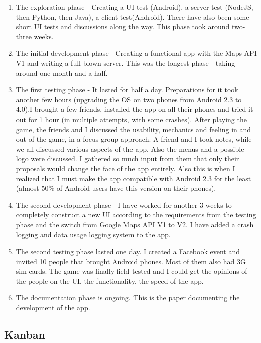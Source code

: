 \documentclass{article}
\begin{document}
\begin{enumerate}
  \item The exploration phase - Creating a UI test (Android), a server test
  (NodeJS, then Python, then Java), a client test(Android). There have also
  been some short UI tests and discussions along the way. This phase took around
  two-three weeks.
  \item The initial development phase - Creating a functional app with the Maps
  API V1 and writing a full-blown server. This was the longest phase - taking
  around one month and a half.
  \item The first testing phase - It lasted for half a day. Preparations for it
  took another few hours (upgrading the OS on two phones from Android 2.3 to
  4.0).I brought a few friends, installed the app on all their phones and tried
  it out for 1 hour (in multiple attempts, with some crashes). After playing
  the game, the friends and I discussed the usability, mechanics and feeling in
  and out of the game, in a focus group approach. A friend and I took notes,
  while we all discussed various aspects of the app. Also the menus and a
  possible logo were discussed. I gathered so much input from them that only
  their proposals would change the face of the app entirely. Also this is when I
  realized that I must make the app compatible with Android 2.3 for the least
  (almost 50\% of Android users have this version on their phones).
  \item The second development phase - I have worked for another 3 weeks to
  completely construct a new UI according to the requirements from the testing
  phase and the switch from Google Maps API V1 to V2. I have added a crash
  logging and data usage logging system to the app.
  \item The second testing phase lasted one day. I created a Facebook
  event and invited 10 people that brought Android phones. Most of them also had
  3G sim cards. The game was finally field tested and I could get the opinions
  of the people on the UI, the functionality, the speed of the app.
  \item The documentation phase is ongoing. This is the paper documenting the
  development of the app.
  
\end{enumerate}

\subsection{Kanban}
\end{document}
